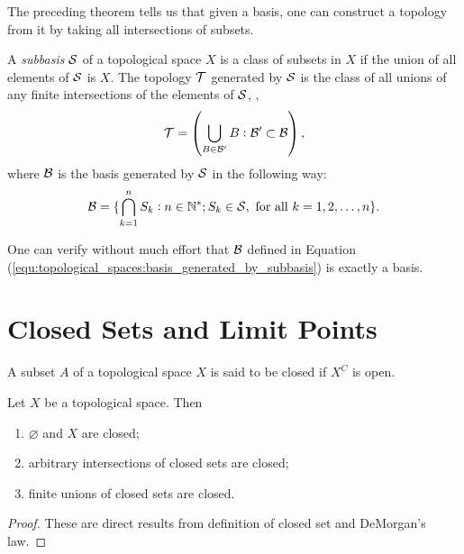 The preceding theorem tells us that given a basis, one can construct a 
topology from it by taking all intersections of subsets. 
\begin{defn}
A \emph{subbasis} $\mathcal{S}$ of a topological space $X$ is a class of subsets in 
$X$ if the union of all elements of $\mathcal{S}$ is $X$. 
The topology $\mathcal{T}$ generated by $\mathcal{S}$ is the class of all unions of any 
finite intersections of the elements of $\mathcal{S}$, \ie, 
\begin{equation*}
    \mathcal{T} = \left( 
        \bigcup_{B \in \mathcal{B}'} B: \mathcal{B}' \subset \mathcal{B}
     \right), 
\end{equation*}
where $\mathcal{B}$ is the basis generated by $\mathcal{S}$ in the following way: 
\begin{equation}
    \label{equ:topological_spaces:basis_generated_by_subbasis}
    \mathcal{B} = \{ \bigcap_{k=1}^n 
    S_k: n \in \mathbb{N}^\ast; S_k \in \mathcal{S}, \text{ for all } k = 1, 2, \ldots, n \}.
\end{equation}
\end{defn}

One can verify without much effort that $\mathcal{B}$ defined in Equation 
(\ref{equ:topological_spaces:basis_generated_by_subbasis}) is exactly a 
basis. 
\section{Closed Sets and Limit Points}
\begin{defn}
A subset $A$ of a topological space $X$ is said to be closed if $X^C$ is 
open. 
\end{defn}

\begin{thm}
Let $X$ be a topological space. Then 
\begin{enumerate}
    \item $\varnothing$ and $X$ are closed; 
    \item arbitrary intersections of closed sets are closed; 
    \item finite unions of closed sets are closed. 
\end{enumerate}
\end{thm}
\begin{proof}
These are direct results from definition of closed set and DeMorgan's law. 
\end{proof}

